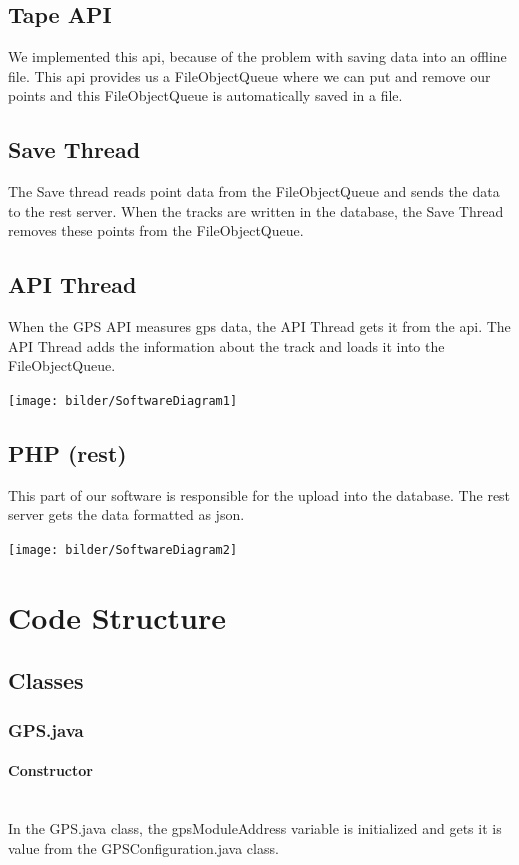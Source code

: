\subsection{Tape API}
We implemented this \gls{api}, because of the problem with saving data into an offline file. This \gls{api} provides us a FileObjectQueue where we can put and remove our points and this FileObjectQueue is automatically saved in a file. 
\subsection{Save Thread}
The Save thread reads point data from the FileObjectQueue and sends the data to the \gls{rest} server. When the tracks are written in the database, the Save Thread removes these points from the FileObjectQueue.
\subsection{API Thread}
When the GPS API measures \gls{gps} data, the API Thread gets it from the \gls{api}. The API Thread adds the information about the track and loads it into the FileObjectQueue.
\begin{center}
\texttt{[image: bilder/SoftwareDiagram1]}
\end{center} 
\subsection{PHP (\gls{rest})}
This part of our software is responsible for the upload into the database. The \gls{rest} server gets the data formatted as \gls{json}.
\begin{center}
\texttt{[image: bilder/SoftwareDiagram2]}
\end{center} 
\section{Code Structure}
\subsection{Classes}
\subsubsection{GPS.java}
\paragraph{Constructor}\mbox{}\\
In the GPS.java class, the gpsModuleAddress variable is initialized and gets it is value from the GPSConfiguration.java class.
